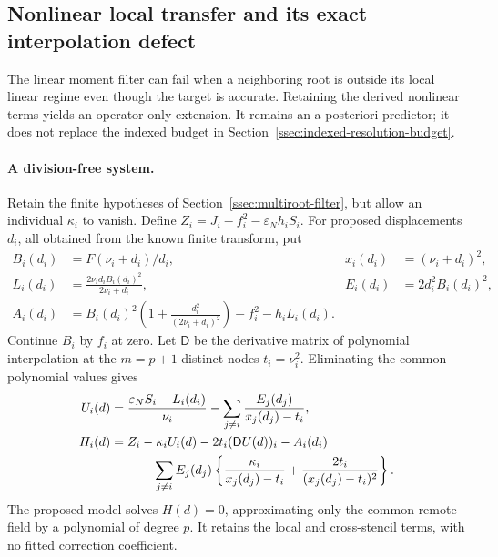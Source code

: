 \subsection{Nonlinear local transfer and its exact interpolation defect}
\label{ssec:nonlinear-local-closure}

The linear moment filter can fail when a neighboring root is outside its
local linear regime even though the target is accurate. Retaining the
derived nonlinear terms yields an operator-only extension. It remains an
a posteriori predictor; it does not replace the indexed budget in
Section~\ref{ssec:indexed-resolution-budget}.

\paragraph{A division-free system.}
Retain the finite hypotheses of Section~\ref{ssec:multiroot-filter}, but
allow an individual $\kappa_i$ to vanish. Define
$Z_i=J_i-f_i^2-\varepsilon_Nh_iS_i$. For proposed displacements $d_i$,
all obtained from the known finite transform, put
\begin{align*}
 B_i(d_i)&=F(\nu_i+d_i)/d_i,
 &x_i(d_i)&=(\nu_i+d_i)^2,\\
 L_i(d_i)&=\frac{2\nu_i d_iB_i(d_i)^2}{2\nu_i+d_i},
 &E_i(d_i)&=2d_i^2B_i(d_i)^2,\\
 A_i(d_i)&=B_i(d_i)^2\left(1+\frac{d_i^2}{(2\nu_i+d_i)^2}\right)
                    -f_i^2-h_iL_i(d_i).
\end{align*}
Continue $B_i$ by $f_i$ at zero. Let $\mathsf D$ be the derivative
matrix of polynomial interpolation at the $m=p+1$ distinct nodes
$t_i=\nu_i^2$. Eliminating the common polynomial values gives
\begin{align}
 U_i(d)&=\frac{\varepsilon_NS_i-L_i(d_i)}{\nu_i}
              -\sum_{j\ne i}\frac{E_j(d_j)}{x_j(d_j)-t_i},\nonumber\\
 H_i(d)&=Z_i-\kappa_iU_i(d)-2t_i(\mathsf D U(d))_i-A_i(d_i)\nonumber\\
 &\hspace{8mm}-\sum_{j\ne i}E_j(d_j)
       \left\{\frac{\kappa_i}{x_j(d_j)-t_i}
                          +\frac{2t_i}{(x_j(d_j)-t_i)^2}\right\}.
 \label{eq:nonlinear-local-system}
\end{align}
The proposed model solves $H(d)=0$, approximating only the common remote
field by a polynomial of degree $p$. It retains the local and
cross-stencil terms, with no fitted correction coefficient.

